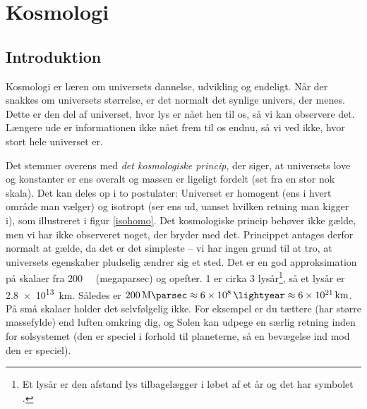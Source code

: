 \chapter{Kosmologi}
\section{Introduktion}
Kosmologi er læren om universets dannelse, udvikling og endeligt. Når der snakkes om universets størrelse, er det normalt det synlige univers, der menes. Dette er den del af universet, hvor lys er nået hen til os, så vi kan observere det. Længere ude er informationen ikke nået frem til os endnu, så vi ved ikke, hvor stort hele universet er. 

Det stemmer overens med \emph{det kosmologiske princip}, der siger, at universets love og konstanter er ens overalt og massen er ligeligt fordelt (set fra en stor nok skala). Det kan deles op i to postulater: Universet er homogent (ens i hvert område man vælger) og isotropt (ser ens ud, uanset hvilken retning man kigger i), som illustreret i figur \ref{isohomo}. Det kosmologiske princip behøver ikke gælde, men vi har ikke observeret noget, der bryder med det. Princippet antages derfor normalt at gælde, da det er det simpleste -- vi har ingen grund til at tro, at universets egenskaber pludselig ændrer sig et sted. Det er en god approksimation på skalaer fra \SI{200}{\mega\parsec} (megaparsec) og opefter. \SI{1}{\parsec} er cirka 3 lysår\footnote{Et lysår er den afstand lys tilbagelægger i løbet af et år og det har symbolet \si{\lightyear}.}, så et lysår er %
\SI{2.8e13}{\kilo\metre}. Således er $\SI{200}{\mega\parsec} \approx \SI{6e8}{\lightyear} \approx \SI{6e21}{\kilo\metre}$.
På små skalaer holder det selvfølgelig ikke. For eksempel er du tættere (har større massefylde) end luften omkring dig, og Solen kan udpege en særlig retning inden for solsystemet (den er speciel i forhold til planeterne, så en bevægelse ind mod den er speciel).

